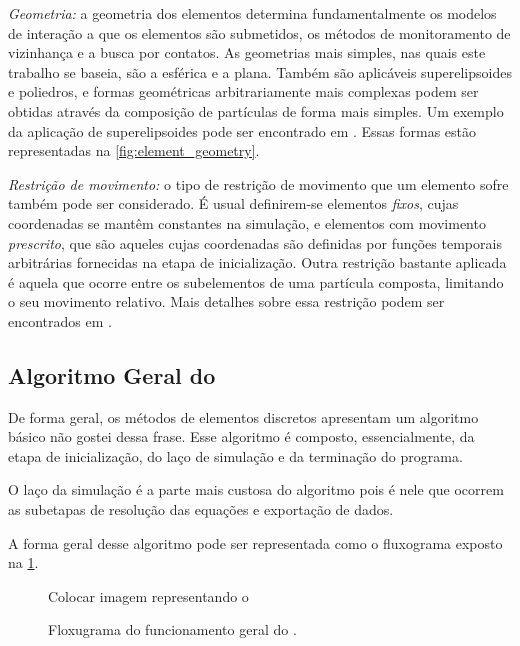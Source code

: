 \begin{alineas}
\item \textit{Geometria:} a geometria dos elementos determina fundamentalmente os modelos de interação a que os elementos são submetidos, os métodos de monitoramento de vizinhança e a busca por contatos. As geometrias mais simples, nas quais este trabalho se baseia, são a esférica e a plana. Também são aplicáveis superelipsoides e poliedros, e formas geométricas arbitrariamente mais complexas podem ser obtidas através da composição de partículas de forma mais simples. Um exemplo da aplicação de superelipsoides pode ser encontrado em . Essas formas estão representadas na \cref{fig:element_geometry}.

\item \textit{Restrição de movimento:} o tipo de restrição de movimento que um elemento sofre também pode ser considerado. É usual definirem-se elementos \textit{fixos}, cujas coordenadas se mantêm constantes na simulação, e elementos com movimento \textit{prescrito}, que são aqueles cujas coordenadas são definidas por funções temporais arbitrárias fornecidas na etapa de inicialização. Outra restrição bastante aplicada é aquela que ocorre entre os subelementos de uma partícula composta, limitando o seu movimento relativo. Mais detalhes sobre essa restrição podem ser encontrados em .
\end{alineas}

\subsection{Algoritmo Geral do \DEM{}} \label{sec:dem_algorithm}

De forma geral, os métodos de elementos discretos apresentam um algoritmo básico \alert{não gostei dessa frase}. Esse algoritmo é composto, essencialmente, da etapa de inicialização, do laço de simulação e da terminação do programa.

O laço da simulação é a parte mais custosa do algoritmo pois é nele que ocorrem as subetapas de resolução das equações e exportação de dados.

A forma geral desse algoritmo pode ser representada como o fluxograma exposto na \cref{fig:general_algorithm}.

\begin{figure}[h]
	\caption{Floxugrama do funcionamento geral do \DEM{}.}
	\centering
		\alert{Colocar imagem representando o \DEM{}}
	\label{fig:general_algorithm}
\end{figure}

